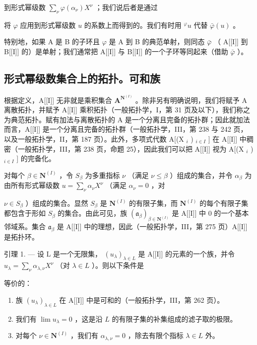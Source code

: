 到形式幂级数 \(\sum_{\nu} \varphi(\alpha_{\nu}) X^{\nu}\) ；我们说后者是通过

将 \(\varphi\) 应用到形式幂级数 \(u\) 的系数上而得到的。我们有时用 \({}^{\varphi}u\) 代替 \(\bar{\varphi}(u)\) 。

特别地，如果 A 是 B 的子环且 \(\varphi\) 是 A 到 B 的典范单射，则同态 \(\bar{\varphi}\) （ A{[}{[}I{]}{]} 到 B{[}{[}I{]}{]} 的）是单射；我们通常把 A{[}{[}I{]}{]} 与 B{[}{[}I{]}{]} 的一个子环等同起来（借助 \(\bar{\varphi}\) ）。

\subsection{形式幂级数集合上的拓扑。可和族}

根据定义，A{[}{[}I{]}{]} 无非就是乘积集合 \(\mathbf{A}^{\mathbf{N}^{(I)}}\) 。除非另有明确说明，我们将赋予 A 离散拓扑，并赋予 A{[}{[}I{]}{]} 乘积拓扑（一般拓扑学，I，第 31 页及以下），我们称之为典范拓扑。赋有加法与离散拓扑的 A 是一个分离且完备的拓扑群；因此就加法而言，A{[}{[}I{]}{]} 是一个分离且完备的拓扑群（一般拓扑学，III，第 238 与 242 页，以及一般拓扑学，II，第 187 页）。此外，多项式代数 A{[}(X \(_{i}\) ) \(_{i\in I}\) {]} 在 A{[}{[}I{]}{]} 中稠密（一般拓扑学，III，第 238 页，命题 25），因此我们可以把 A{[}{[}I{]}{]} 视为 A{[}(X \(_{i}\) ) \(_{i\in I}\) {]} 的完备化。

对每个 \(\beta \in \mathbf{N}^{(I)}\) ，令 \(S_{\beta}\) 为多重指标 \(\nu\) （满足 \(\nu \leqslant \beta\) ）组成的集合，并令 \(\alpha_{\beta}\) 为由所有形式幂级数 \(u = \sum_{\nu} \alpha_{\nu} X^{\nu}\) （满足 \(\alpha_{\nu} = 0\) ，对

\(\nu \in S_{\beta}\) ）组成的集合。显然 \(S_{\beta}\) 是 \(\mathbf{N}^{(I)}\) 的有限子集，而 \(\mathbf{N}^{(I)}\) 的每个有限子集都包含于形如 \(S_{\beta}\) 的集合。由此可见，族 \((\mathfrak{a}_{\beta})_{\beta \in \mathbf{N}^{(I)}}\) 是 A{[}{[}I{]}{]} 中 0 的一个基本邻域系。集合 \(\mathfrak{a}_{\beta}\) 是 A{[}{[}I{]}{]} 中的理想，因此（一般拓扑学，III，第 275 页）A{[}{[}I{]}{]} 是拓扑环。

引理 1. --- 设 L 是一个无限集， \((u_{\lambda})_{\lambda \in L}\) 是 A{[}{[}I{]}{]} 的元素的一个族，并令 \(u_{\lambda} = \sum_{\nu} \alpha_{\lambda, \nu} X^{\nu}\) （对 \(\lambda \in L\) ）。则以下条件是

等价的：

\begin{enumerate}
\def\labelenumi{(\roman{enumi})}
\item
  族 \((u_{\lambda})_{\lambda \in L}\) 在 A{[}{[}I{]}{]} 中是可和的（一般拓扑学，III，第 262 页）。
\item
  我们有 \(\lim u_{\lambda} = 0\) ，这是沿 \(L\) 的有限子集的补集组成的滤子取的极限。
\item
  对每个 \(\nu \in \mathbf{N}^{(I)}\) ，我们有 \(\alpha_{\lambda, \nu} = 0\) ，除去有限个指标 \(\lambda \in L\) 外。
\end{enumerate}

